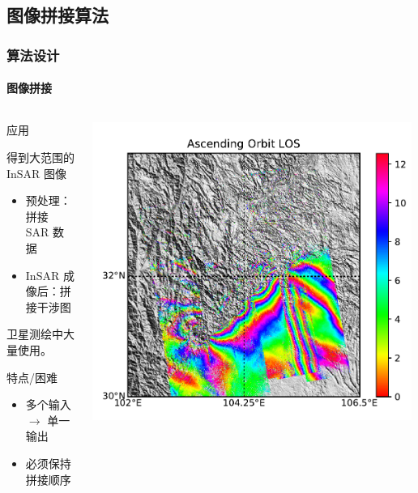 \documentclass{beamer}
\begin{document}
\subsection{图像拼接算法}

\begin{frame}
    \frametitle{算法设计}
    \framesubtitle{图像拼接}

    \begin{columns}
        \begin{column}{0.5\textwidth}
            \begin{block}{应用}
                \begin{small}
                得到大范围的 InSAR 图像
                \begin{itemize}
                    \item 预处理：拼接 SAR 数据
                    \item InSAR 成像后：拼接干涉图
                \end{itemize}
                卫星测绘中大量使用。
                \end{small}
            \end{block}
            \begin{block}{特点/困难}
                \begin{small}
                \begin{itemize}
                    \item 多个输入 $\to$ 单一输出
                    \item 必须保持拼接顺序
                \end{itemize}
                \end{small}
            \end{block}
        \end{column}
        \begin{column}{0.5\textwidth}
            \centering
            \includegraphics[width=0.99\textwidth]{figures/wenchuan.png}

\end{column}
\end{columns}
\end{frame}
\end{document}
